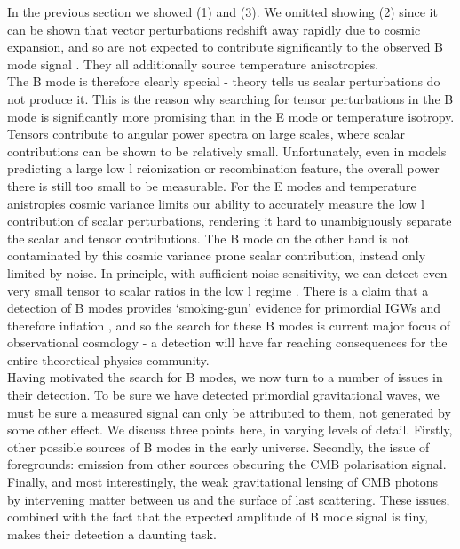 \documentclass[a4paper,10pt]{article}
\begin{document}
In the previous section we showed (1) and (3). We omitted showing (2) since it can be shown that vector perturbations redshift away rapidly due to cosmic expansion, and so are not expected to contribute significantly to the observed B mode signal  \cite{vector}. They all additionally source temperature anisotropies.\\

The B mode is therefore clearly special - theory tells us scalar perturbations do not produce it. This is the reason why searching for tensor perturbations in the B mode is significantly more promising than in the E mode or temperature isotropy. Tensors contribute to angular power spectra on large scales, where scalar contributions can be shown to be relatively small. Unfortunately, even in models predicting a large low l reionization or recombination feature, the overall power there is still too small to be measurable. For the E modes and temperature anistropies cosmic variance limits our ability to accurately measure the low l contribution of scalar perturbations, rendering it hard to unambiguously separate the scalar and tensor contributions. The B mode on the other hand is not contaminated by this cosmic variance prone scalar contribution, instead only limited by noise. In principle, with sufficient noise sensitivity, we can detect even very small tensor to scalar ratios in the low l regime \cite{Seljak_1997}. There is a claim that a detection of B modes provides `smoking-gun' evidence for primordial IGWs and therefore inflation \cite{smokinggun}, and so the search for these B modes is current major focus of observational cosmology - a detection will have far reaching consequences for the entire theoretical physics community. \\

Having motivated the search for B modes, we now turn to a number of issues in their detection. To be sure we have detected primordial gravitational waves, we must be sure a measured signal can only be attributed to them, not generated by some other effect. We discuss three points here, in varying levels of detail. Firstly, other possible sources of B modes in the early universe. Secondly, the issue of foregrounds: emission from other sources obscuring the CMB polarisation signal. Finally, and most interestingly, the weak gravitational lensing of CMB photons by intervening matter between us and the surface of last scattering. These issues, combined with the fact that the expected amplitude of B mode signal is tiny, makes their detection a daunting task.
\end{document}
